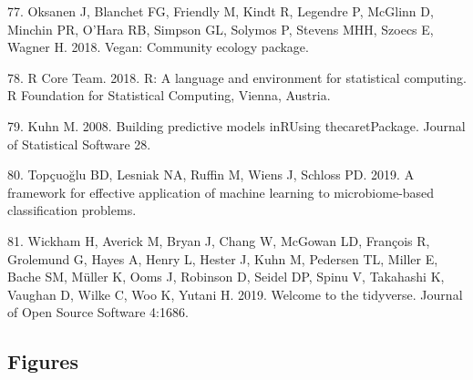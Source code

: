 \documentclass[11pt,]{article}
\begin{document}
\hypertarget{ref-Vegan2018}{}
77. Oksanen J, Blanchet FG, Friendly M, Kindt R, Legendre P, McGlinn D,
Minchin PR, O'Hara RB, Simpson GL, Solymos P, Stevens MHH, Szoecs E,
Wagner H. 2018. Vegan: Community ecology package.

\hypertarget{ref-r_citation_2018}{}
78. R Core Team. 2018. R: A language and environment for statistical
computing. R Foundation for Statistical Computing, Vienna, Austria.

\hypertarget{ref-Kuhn2008}{}
79. Kuhn M. 2008. Building predictive models inRUsing thecaretPackage.
Journal of Statistical Software 28.

\hypertarget{ref-Topcuoglu2019}{}
80. Topçuoğlu BD, Lesniak NA, Ruffin M, Wiens J, Schloss PD. 2019. A
framework for effective application of machine learning to
microbiome-based classification problems.

\hypertarget{ref-Tidyverse2019}{}
81. Wickham H, Averick M, Bryan J, Chang W, McGowan LD, François R,
Grolemund G, Hayes A, Henry L, Hester J, Kuhn M, Pedersen TL, Miller E,
Bache SM, Müller K, Ooms J, Robinson D, Seidel DP, Spinu V, Takahashi K,
Vaughan D, Wilke C, Woo K, Yutani H. 2019. Welcome to the tidyverse.
Journal of Open Source Software 4:1686.

\newpage

\subsection{Figures}\label{figures}
\end{document}
